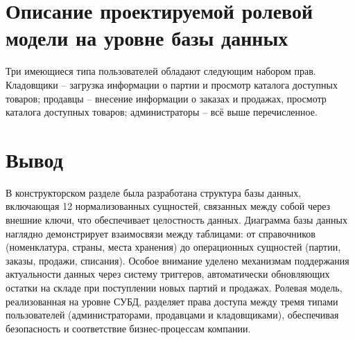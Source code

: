 \section{Описание проектируемой ролевой модели на уровне базы данных}
Три имеющиеся типа пользователей обладают следующим набором прав. Кладовщики -- загрузка информации  о партии и просмотр каталога доступных товаров; продавцы -- внесение информации о заказах и продажах, просмотр каталога доступных товаров; администраторы -- всё выше перечисленное. 
\section*{Вывод}
В конструкторском разделе была разработана структура базы данных, включающая 12 нормализованных сущностей, связанных между собой через внешние ключи, что обеспечивает целостность данных. Диаграмма базы данных наглядно демонстрирует взаимосвязи между таблицами: от справочников (номенклатура, страны, места хранения) до операционных сущностей (партии, заказы, продажи, списания). Особое внимание уделено механизмам поддержания актуальности данных через систему триггеров, автоматически обновляющих остатки на складе при поступлении новых партий и продажах. Ролевая модель, реализованная на уровне СУБД, разделяет права доступа между тремя типами пользователей (администраторами, продавцами и кладовщиками), обеспечивая безопасность и соответствие бизнес-процессам компании.
